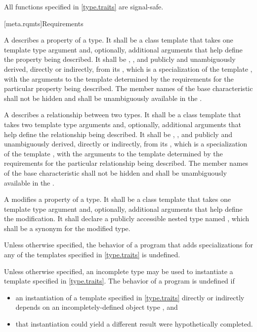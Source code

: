 \pnum
{}%
All functions specified in \ref{type.traits} are signal-safe.

[meta.rqmts]{Requirements}

\pnum
A  describes a property
of a type. It shall be a class template that takes one template type
argument and, optionally, additional arguments that help define the
property being described. It shall be ,
,
and publicly and unambiguously derived, directly or indirectly, from
its , which is
a specialization of the template
, with
the arguments to the template  determined by the
requirements for the particular property being described.
The member names of the base characteristic shall not be hidden and shall be
unambiguously available in the .

\pnum
A  describes a
relationship between two types. It shall be a class template that
takes two template type arguments and, optionally, additional
arguments that help define the relationship being described. It shall
be , ,
and publicly and unambiguously derived, directly or
indirectly, from
its , which is a specialization
of the template
, with
the arguments to the template  determined by the
requirements for the particular relationship being described.
The member names of the base characteristic shall not be hidden and shall be
unambiguously available in the .

\pnum
A 
modifies a property
of a type. It shall be a class template that takes one
template type argument and, optionally, additional arguments that help
define the modification. It shall declare a publicly accessible nested type
named , which shall be a synonym for the modified type.

\pnum
Unless otherwise specified,
the behavior of a program that adds specializations
for any of the templates specified in \ref{type.traits}
is undefined.

\pnum
Unless otherwise specified, an incomplete type may be used
to instantiate a template specified in \ref{type.traits}.
The behavior of a program is undefined if
\begin{itemize}
\item
  an instantiation of a template specified in \ref{type.traits}
  directly or indirectly depends on
  an incompletely-defined object type , and
\item
  that instantiation could yield a different result
  were  hypothetically completed.
\end{itemize}

